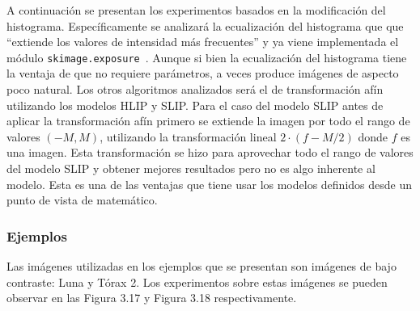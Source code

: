 A continuaci\'on se presentan los experimentos basados en la modificaci\'on del histograma. Espec\'ificamente se analizar\'a la ecualizaci\'on del histograma que  que ``extiende los valores de intensidad más frecuentes'' y ya viene implementada el m\'odulo \verb|skimage.exposure|~\cite{histogram_equalization}. Aunque si bien la ecualización del histograma tiene la ventaja de que no requiere parámetros, a veces produce imágenes de aspecto poco natural. Los otros algoritmos analizados ser\'a el de transformaci\'on af\'in utilizando los modelos HLIP y SLIP. Para el caso del modelo SLIP antes de aplicar la transformaci\'on af\'in primero se extiende la imagen por todo el rango de valores $(-M,M)$, utilizando la transformaci\'on lineal $2\cdot(f-M/2)$ donde $f$ es una imagen. Esta transformaci\'on se hizo para aprovechar todo el rango de valores del modelo SLIP y obtener mejores resultados pero no es algo inherente al modelo. Esta es una de las ventajas que tiene usar los modelos definidos desde un punto de vista de matem\'atico. 

\subsubsection{Ejemplos}

Las im\'agenes utilizadas en los ejemplos que se presentan son im\'agenes de bajo contraste: Luna y T\'orax 2. Los experimentos sobre estas im\'agenes se pueden observar en las Figura 3.17 y Figura 3.18 respectivamente.

